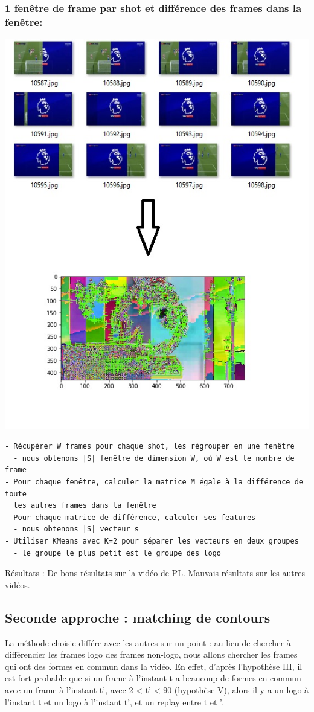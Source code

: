 \documentclass[11pt]{article}
\begin{document}
\subsubsection{1 fenêtre de frame par shot et différence des frames dans la fenêtre:}
\label{sec:org7845cc7}
\begin{center}
\includegraphics[width=.9\linewidth]{orb_window_diff_res.JPG}
\end{center}
\begin{verbatim}
- Récupérer W frames pour chaque shot, les régrouper en une fenêtre
  - nous obtenons |S| fenêtre de dimension W, où W est le nombre de frame
- Pour chaque fenêtre, calculer la matrice M égale à la différence de toute
  les autres frames dans la fenêtre
- Pour chaque matrice de différence, calculer ses features
  - nous obtenons |S| vecteur s
- Utiliser KMeans avec K=2 pour séparer les vecteurs en deux groupes
  - le groupe le plus petit est le groupe des logo
\end{verbatim}
Résultats :
De bons résultats sur la vidéo de PL.
Mauvais résultats sur les autres vidéos.

\subsection{Seconde approche : matching de contours}
\label{sec:orge885d02}
La méthode choisie différe avec les autres sur un point : au lieu de chercher à différencier les frames logo des frames non-logo, nous allons chercher les frames qui ont des formes en commun dans la vidéo.
En effet, d'après l'hypothèse III, il est fort probable que si un frame à l'instant t a beaucoup de formes en commun avec un frame à l'instant t', avec 2 < t' < 90 (hypothèse V), alors il y a un logo à l'instant t et un logo à l'instant t', et un replay entre t et '.
\end{document}
